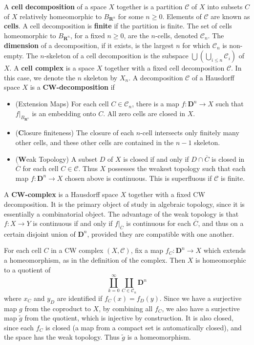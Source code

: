 A {\bf cell decomposition} of a space $X$ together is a partition $\mathcal{C}$ of $X$ into subsets $C$ of $X$ relatively homeomorphic to $B_{\mathbf{R}^n}$ for some $n \geq 0$. Elements of $\mathcal{C}$ are known as {\bf cells}. A cell decomposition is {\bf finite} if the partition is finite. The set of cells homeomorphic to $B_{\mathbf{R}^n}$, for a fixed $n \geq 0$, are the $n$-cells, denoted $\mathcal{C}_n$. The {\bf dimension} of a decomposition, if it exists, is the largest $n$ for which $\mathcal{C}_n$ is non-empty. The $n$-skeleton of a cell decomposition is the subspace $\bigcup \left( \bigcup_{i \leq n} \mathcal{C}_i \right)$ of $X$. A {\bf cell complex} is a space $X$ together with a fixed cell decomposition $\mathcal{C}$. In this case, we denote the $n$ skeleton by $X_n$. A decomposition $\mathcal{C}$ of a Hausdorff space $X$ is a {\bf CW-decomposition} if
%
\begin{itemize}
    \item (Extension Maps) For each cell $C \in \mathcal{C}_n$, there is a map $f: \mathbf{D}^n \to X$ such that $f|_{B_{\mathbf{R}^n}}$ is an embedding onto $C$. All zero cells are closed in $X$.
    \item ({\bf C}losure finiteness) The closure of each $n$-cell intersects only finitely many other cells, and these other cells are contained in the $n-1$ skeleton.
    \item ({\bf W}eak Topology) A subset $D$ of $X$ is closed if and only if $D \cap \overline{C}$ is closed in $\overline{C}$ for each cell $C \in \mathcal{C}$. Thus $X$ possesses the weakest topology such that each map $f: \mathbf{D}^n \to X$ chosen above is continuous. This is superfluous if $\mathcal{C}$ is finite.
\end{itemize}
%
A {\bf CW-complex} is a Hausdorff space $X$ together with a fixed CW decomposition. It is the primary object of study in algebraic topology, since it is essentially a combinatorial object. The advantage of the weak topology is that $f: X \to Y$ is continuous if and only if $f|_{\overline{C}}$ is continuous for each $\overline{C}$, and thus on a certain disjoint union of $\mathbf{D}^n$, provided they are compatible with one another.

For each cell $C$ in a CW complex $(X,\mathcal{C})$, fix a map $f_C: \mathbf{D}^n \to X$ which extends a homeomorphism, as in the definition of the complex. Then $X$ is homeomorphic to a quotient of
%
\[ \coprod_{k = 0}^\infty \coprod_{C \in \mathcal{C}_n} \mathbf{D}^n \]
%
where $x_C$ and $y_D$ are identified if $f_C(x) = f_D(y)$. Since we have a surjective map $g$ from the coproduct to $X$, by combining all $f_C$, we also have a surjective map $\tilde{g}$ from the quotient, which is injective by construction. It is also closed, since each $f_C$ is closed (a map from a compact set is automatically closed), and the space has the weak topology. Thus $\tilde{g}$ is a homeomorphism.

